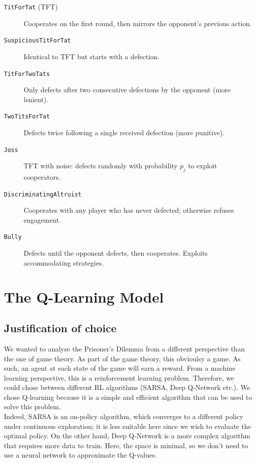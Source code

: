 \documentclass[11pt, a4paper]{article}
\begin{document}
\begin{description}
  \item[\texttt{TitForTat} (TFT)] Cooperates on the first round, then mirrors the opponent's previous action.
  \item[\texttt{SuspiciousTitForTat}] Identical to TFT but starts with a defection.
  \item[\texttt{TitForTwoTats}] Only defects after two consecutive defections by the opponent (more lenient).
  \item[\texttt{TwoTitsForTat}] Defects twice following a single received defection (more punitive).
  \item[\texttt{Joss}] TFT with noise: defects randomly with probability $p_j$ to exploit cooperators.
  \item[\texttt{DiscriminatingAltruist}] Cooperates with any player who has never defected; otherwise refuses engagement.
  \item[\texttt{Bully}] Defects until the opponent defects, then cooperates. Exploits accommodating strategies.
\end{description}
\newpage

\section{The Q-Learning Model}
\label{sec:qlearning}


\subsection{Justification of choice}

We wanted to analyse the Prisoner's Dilemma from a different perspective than the one of game theory. As part of the game theory, this obvioulsy a game. As such,
an agent at each state of the game will earn a reward. From a machine learning perspective, this is a reinforcement learning problem. 
Therefore, we could chose between different RL algorithms (SARSA, Deep Q-Network etc.). We chose Q-learning because it is a simple and efficient algorithm that can be used to solve this problem.\\

Indeed, SARSA is an on-policy algorithm, which converges to a different policy under continuous exploration; it is less suitable here since we wish to evaluate the optimal policy. On the other hand, Deep Q-Network is a more complex algorithm that requires more data to train. Here, the space is minimal, so we don't need to use a neural network to approximate the Q-values.\\
\end{document}
